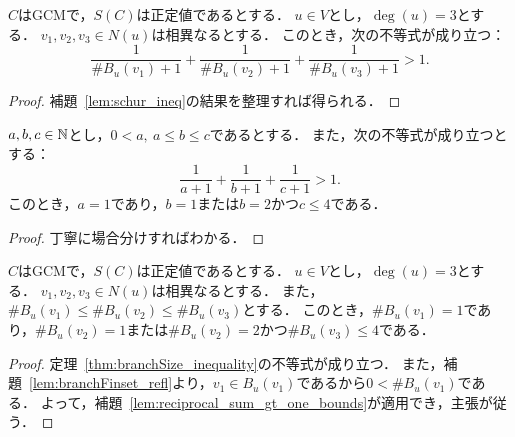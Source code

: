 \begin{theorem}
  \label{thm:branchSize_inequality}
  \leanok
  $C$はGCMで，$S(C)$は正定値であるとする．
  $u \in V$とし，$\deg(u) = 3$とする．
  $v_1, v_2, v_3 \in N(u)$は相異なるとする．
  このとき，次の不等式が成り立つ：
  \begin{equation}
    \frac{1}{\# B_u(v_1) + 1} + \frac{1}{\# B_u(v_2) + 1} + \frac{1}{\# B_u(v_3) + 1}
    > 1.
  \end{equation}
\end{theorem}

\begin{proof}
  補題~\ref{lem:schur_ineq}の結果を整理すれば得られる．
\end{proof}

\begin{lemma}
  \label{lem:reciprocal_sum_gt_one_bounds}
  \leanok
  \uses{}
  $a, b, c \in \mathbb{N}$とし，$0 < a,\ a \le b \le c$であるとする．
  また，次の不等式が成り立つとする：
  \begin{equation}
    \frac{1}{a + 1} + \frac{1}{b + 1} + \frac{1}{c + 1} > 1.
  \end{equation}
  このとき，$a = 1$であり，$b = 1$または$b = 2$かつ$c \le 4$である．
\end{lemma}

\begin{proof}
  丁寧に場合分けすればわかる．
\end{proof}

\begin{theorem}
  \label{thm:branchSize_bounds}
  \leanok
  $C$はGCMで，$S(C)$は正定値であるとする．
  $u \in V$とし，$\deg(u) = 3$とする．
  $v_1, v_2, v_3 \in N(u)$は相異なるとする．
  また，$\# B_u(v_1) \le \# B_u(v_2) \le \# B_u(v_3)$とする．
  このとき，$\# B_u(v_1) = 1$であり，$\# B_u(v_2) = 1$または$\# B_u(v_2) = 2$かつ$\# B_u(v_3) \le 4$である．
\end{theorem}

\begin{proof}
  定理~\ref{thm:branchSize_inequality}の不等式が成り立つ．
  また，補題~\ref{lem:branchFinset_refl}より，$v_1 \in B_u(v_1)$であるから$0 < \# B_u(v_1)$である．
  よって，補題~\ref{lem:reciprocal_sum_gt_one_bounds}が適用でき，主張が従う．
\end{proof}